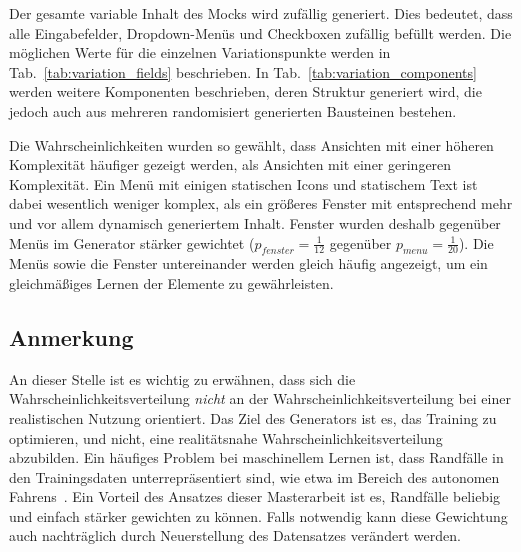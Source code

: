 Der gesamte variable Inhalt des Mocks wird zufällig generiert. Dies bedeutet, dass alle Eingabefelder, Dropdown-Menüs und Checkboxen zufällig befüllt werden. Die möglichen Werte für die einzelnen Variationspunkte werden in Tab.~\ref{tab:variation_fields} beschrieben. In Tab.~\ref{tab:variation_components} werden weitere Komponenten beschrieben, deren Struktur generiert wird, die jedoch auch aus mehreren randomisiert generierten Bausteinen bestehen.

Die Wahrscheinlichkeiten wurden so gewählt, dass Ansichten mit einer höheren Komplexität häufiger gezeigt werden, als Ansichten mit einer geringeren Komplexität. Ein Menü mit einigen statischen Icons und statischem Text ist dabei wesentlich weniger komplex, als ein größeres Fenster mit entsprechend mehr und vor allem dynamisch generiertem Inhalt. Fenster wurden deshalb gegenüber Menüs im Generator stärker gewichtet ($p_{fenster}=\frac{1}{12}$ gegenüber $p_{menu}=\frac{1}{20}$). Die Menüs sowie die Fenster untereinander werden gleich häufig angezeigt, um ein gleichmäßiges Lernen der Elemente zu gewährleisten.

\subsection{Anmerkung}
An dieser Stelle ist es wichtig zu erwähnen, dass sich die Wahrscheinlichkeitsverteilung \emph{nicht} an der Wahrscheinlichkeitsverteilung bei einer realistischen Nutzung orientiert. Das Ziel des Generators ist es, das Training zu optimieren, und nicht, eine realitätsnahe Wahrscheinlichkeitsverteilung abzubilden. Ein häufiges Problem bei maschinellem Lernen ist, dass Randfälle in den Trainingsdaten unterrepräsentiert sind, wie etwa im Bereich des autonomen Fahrens~\cite{karunakaranEfficientStatisticalValidation2020}. Ein Vorteil des Ansatzes dieser Masterarbeit ist es, Randfälle beliebig und einfach stärker gewichten zu können. Falls notwendig kann diese Gewichtung auch nachträglich durch Neuerstellung des Datensatzes verändert werden.


